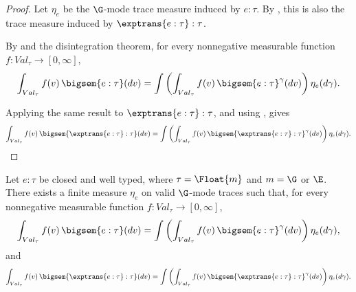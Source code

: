 \begin{proof}
  Let $\eta_e$ be the $\G$-mode trace measure induced by $e:\tau$.
  By , this is also the trace
  measure induced by $\exptrans{e:\tau}:\tau$.

  By  and the disintegration theorem,
  for every nonnegative measurable function
  $f:Val_\tau\to[0,\infty]$,
  \[
    \int_{Val_\tau}
      f(v)\,
      \bigsem{e:\tau}(dv)
    =
    \int
      \left(
        \int_{Val_\tau}
          f(v)\,
          \bigsem{e:\tau}^{\gamma}(dv)
      \right)
      \eta_e(d\gamma).
  \]

  Applying the same result to $\exptrans{e:\tau}:\tau$, and using
  , gives
  \[
    \int_{Val_\tau}
      f(v)\,
      \bigsem{\exptrans{e:\tau}:\tau}(dv)
    =
    \int
      \left(
        \int_{Val_\tau}
          f(v)\,
          \bigsem{\exptrans{e:\tau}:\tau}^{\gamma}(dv)
      \right)
      \eta_e(d\gamma).
  \]
\end{proof}

\begin{theorem}
  \label{thm:trace-decomposition}
  Let $e:\tau$ be closed and well typed, where
  $\tau=\Float{m}$ and $m=\G$ or $\E$.
  There exists a finite measure $\eta_e$ on valid $\G$-mode traces such
  that, for every nonnegative measurable function
  $f:Val_\tau\to[0,\infty]$,
  \[
    \int_{Val_\tau}
      f(v)\,
      \bigsem{e:\tau}(dv)
    =
    \int
      \left(
        \int_{Val_\tau}
          f(v)\,
          \bigsem{e:\tau}^{\gamma}(dv)
      \right)
      \eta_e(d\gamma),
  \]
  and
  \[
    \int_{Val_\tau}
      f(v)\,
      \bigsem{\exptrans{e:\tau}:\tau}(dv)
    =
    \int
      \left(
        \int_{Val_\tau}
          f(v)\,
          \bigsem{\exptrans{e:\tau}:\tau}^{\gamma}(dv)
      \right)
      \eta_e(d\gamma).
  \]
\end{theorem}


